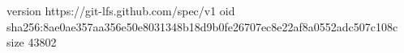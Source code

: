 version https://git-lfs.github.com/spec/v1
oid sha256:8ae0ae357aa356e50e8031348b18d9b0fe26707ec8e22af8a0552adc507c108c
size 43802
